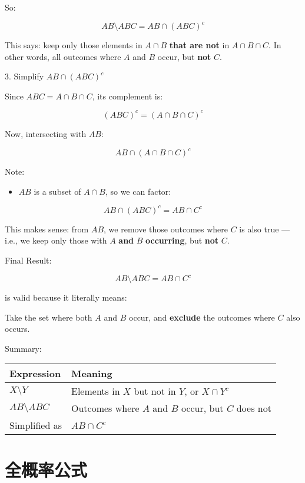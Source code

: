 \documentclass[a4paper]{ctexbook}
\begin{document}
So:

$$
AB \setminus ABC = AB \cap (ABC)^c
$$

This says: keep only those elements in $A \cap B$ \textbf{that are not} in $A \cap B \cap C$. In other words, all outcomes where $A$ and $B$ occur, but \textbf{not} $C$.

\hrulefill

3. Simplify $AB \cap (ABC)^c$

Since $ABC = A \cap B \cap C$, its complement is:

$$
(ABC)^c = (A \cap B \cap C)^c
$$

Now, intersecting with $AB$:

$$
AB \cap (A \cap B \cap C)^c
$$

Note:
\begin{itemize}
\item 
$AB$ is a subset of $A \cap B$, so we can factor:

\end{itemize}

$$
AB \cap (ABC)^c = AB \cap C^c
$$

This makes sense: from $AB$, we remove those outcomes where $C$ is also true — i.e., we keep only those with $A$ \textbf{and} $B$ \textbf{occurring}, but \textbf{not} $C$.

\hrulefill

Final Result:

$$
AB \setminus ABC = AB \cap C^c
$$

is valid because it literally means:

Take the set where both $A$ and $B$ occur, and \textbf{exclude} the outcomes where $C$ also occurs.

\hrulefill

Summary:

\begin{tabular}{l l}
Expression & Meaning \\
\hline
$X \setminus Y$ & Elements in $X$ but not in $Y$, or $X \cap Y^c$ \\
$AB \setminus ABC$ & Outcomes where $A$ and $B$ occur, but $C$ does not \\
Simplified as & $AB \cap C^c$ \\
\end{tabular}

\section{全概率公式}
\end{document}
